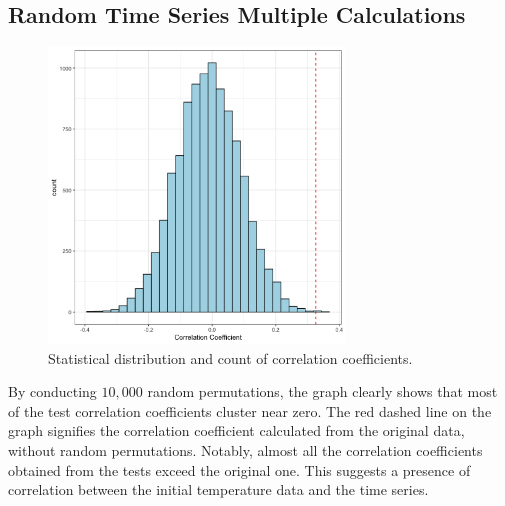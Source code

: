 \documentclass[a4paper,12pt]{article}
\begin{document}
\subsection{Random Time Series Multiple Calculations}
  \begin{figure}[ht]
    \centering
    \includegraphics[width=0.7\textwidth]{../data/ats_random_plot.png}
    \caption{Statistical distribution and count of correlation coefficients.}
  \end{figure}
  By conducting $10,000$ random permutations, the graph clearly shows that most of the test correlation coefficients cluster near zero. The red dashed line on the graph signifies the correlation coefficient calculated from the original data, without random permutations. Notably, almost all the correlation coefficients obtained from the tests exceed the original one. This suggests a presence of correlation between the initial temperature data and the time series.
\end{document}
